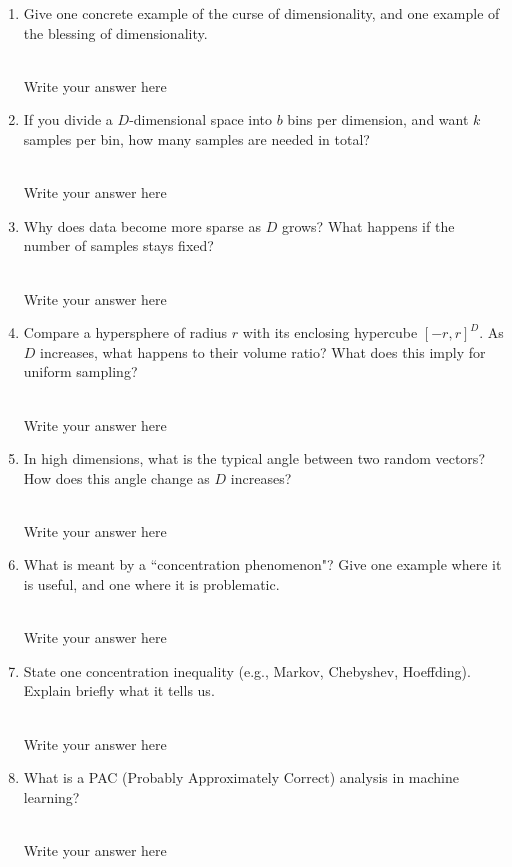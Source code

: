 \documentclass[a4paper]{article}
\begin{document}
\begin{enumerate}
    \item Give one concrete example of the curse of dimensionality, and one example of the blessing of dimensionality.
        
    \hrulefill\\
    Write your answer here
    
    \item If you divide a $D$-dimensional space into $b$ bins per dimension, and want $k$ samples per bin, how many samples are needed in total?
        
    \hrulefill\\
    Write your answer here
    
    \item Why does data become more sparse as $D$ grows? What happens if the number of samples stays fixed?
        
    \hrulefill\\
    Write your answer here
    
    \item Compare a hypersphere of radius $r$ with its enclosing hypercube $[-r,r]^D$. As $D$ increases, what happens to their volume ratio? What does this imply for uniform sampling?
        
    \hrulefill\\
    Write your answer here
    
    \item In high dimensions, what is the typical angle between two random vectors? How does this angle change as $D$ increases?
        
    \hrulefill\\
    Write your answer here
     
    \item What is meant by a ``concentration phenomenon"? Give one example where it is useful, and one where it is problematic.
        
    \hrulefill\\
    Write your answer here
    
    \item State one concentration inequality (e.g., Markov, Chebyshev, Hoeffding). Explain briefly what it tells us.
        
    \hrulefill\\
    Write your answer here
    
    \item What is a PAC (Probably Approximately Correct) analysis in machine learning?
        
    \hrulefill\\
    Write your answer here

\end{enumerate}
\end{document}
